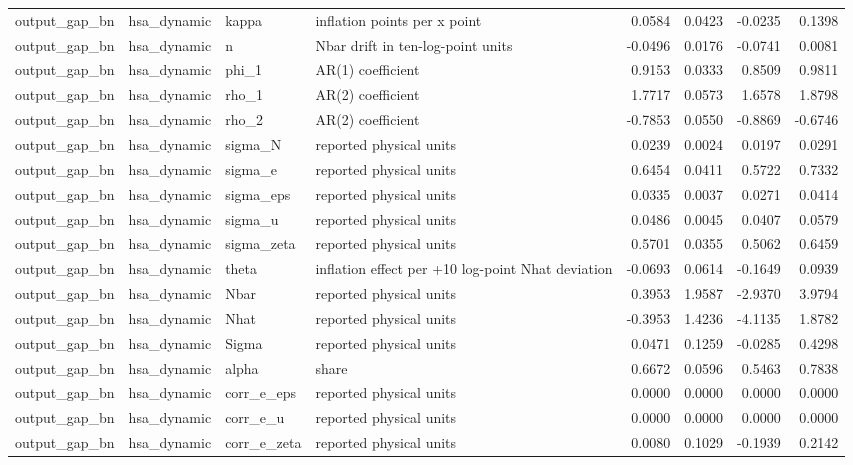 \begin{tabular}{llllrrrr}
output\_gap\_bn & hsa\_dynamic & kappa & inflation points per x point & 0.0584 & 0.0423 & -0.0235 & 0.1398 \\
output\_gap\_bn & hsa\_dynamic & n & Nbar drift in ten-log-point units & -0.0496 & 0.0176 & -0.0741 & 0.0081 \\
output\_gap\_bn & hsa\_dynamic & phi\_1 & AR(1) coefficient & 0.9153 & 0.0333 & 0.8509 & 0.9811 \\
output\_gap\_bn & hsa\_dynamic & rho\_1 & AR(2) coefficient & 1.7717 & 0.0573 & 1.6578 & 1.8798 \\
output\_gap\_bn & hsa\_dynamic & rho\_2 & AR(2) coefficient & -0.7853 & 0.0550 & -0.8869 & -0.6746 \\
output\_gap\_bn & hsa\_dynamic & sigma\_N & reported physical units & 0.0239 & 0.0024 & 0.0197 & 0.0291 \\
output\_gap\_bn & hsa\_dynamic & sigma\_e & reported physical units & 0.6454 & 0.0411 & 0.5722 & 0.7332 \\
output\_gap\_bn & hsa\_dynamic & sigma\_eps & reported physical units & 0.0335 & 0.0037 & 0.0271 & 0.0414 \\
output\_gap\_bn & hsa\_dynamic & sigma\_u & reported physical units & 0.0486 & 0.0045 & 0.0407 & 0.0579 \\
output\_gap\_bn & hsa\_dynamic & sigma\_zeta & reported physical units & 0.5701 & 0.0355 & 0.5062 & 0.6459 \\
output\_gap\_bn & hsa\_dynamic & theta & inflation effect per +10 log-point Nhat deviation & -0.0693 & 0.0614 & -0.1649 & 0.0939 \\
output\_gap\_bn & hsa\_dynamic & Nbar & reported physical units & 0.3953 & 1.9587 & -2.9370 & 3.9794 \\
output\_gap\_bn & hsa\_dynamic & Nhat & reported physical units & -0.3953 & 1.4236 & -4.1135 & 1.8782 \\
output\_gap\_bn & hsa\_dynamic & Sigma & reported physical units & 0.0471 & 0.1259 & -0.0285 & 0.4298 \\
output\_gap\_bn & hsa\_dynamic & alpha & share & 0.6672 & 0.0596 & 0.5463 & 0.7838 \\
output\_gap\_bn & hsa\_dynamic & corr\_e\_eps & reported physical units & 0.0000 & 0.0000 & 0.0000 & 0.0000 \\
output\_gap\_bn & hsa\_dynamic & corr\_e\_u & reported physical units & 0.0000 & 0.0000 & 0.0000 & 0.0000 \\
output\_gap\_bn & hsa\_dynamic & corr\_e\_zeta & reported physical units & 0.0080 & 0.1029 & -0.1939 & 0.2142 \\

\end{tabular}
